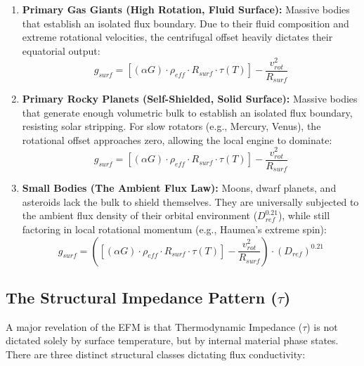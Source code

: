 \documentclass[11pt, a4paper]{article}
\begin{document}
\begin{enumerate}
  \item \textbf{Primary Gas Giants (High Rotation, Fluid Surface):} Massive bodies that establish an isolated flux boundary. Due to their fluid composition and extreme rotational velocities, the centrifugal offset heavily dictates their equatorial output:
  \begin{equation}
    g_{surf} = \left[(\alpha G) \cdot \rho_{eff} \cdot R_{surf} \cdot \tau(T)\right] - \frac{v_{rot}^2}{R_{surf}}
  \end{equation}
  
  \item \textbf{Primary Rocky Planets (Self-Shielded, Solid Surface):} Massive bodies that generate enough volumetric bulk to establish an isolated flux boundary, resisting solar stripping. For slow rotators (e.g., Mercury, Venus), the rotational offset approaches zero, allowing the local engine to dominate:
  \begin{equation}
    g_{surf} = \left[(\alpha G) \cdot \rho_{eff} \cdot R_{surf} \cdot \tau(T)\right] - \frac{v_{rot}^2}{R_{surf}}
  \end{equation}
  
  \item \textbf{Small Bodies (The Ambient Flux Law):} Moons, dwarf planets, and asteroids lack the bulk to shield themselves. They are universally subjected to the ambient flux density of their orbital environment ($D_{ref}^{0.21}$), while still factoring in local rotational momentum (e.g., Haumea's extreme spin):
  \begin{equation}
    g_{surf} = \left(\left[(\alpha G) \cdot \rho_{eff} \cdot R_{surf} \cdot \tau(T)\right] - \frac{v_{rot}^2}{R_{surf}}\right) \cdot (D_{ref})^{0.21}
  \end{equation}
\end{enumerate}

\subsection{The Structural Impedance Pattern ($\tau$)}

A major revelation of the EFM is that Thermodynamic Impedance ($\tau$) is not dictated solely by surface temperature, but by internal material phase states. There are three distinct structural classes dictating flux conductivity:
\end{document}
